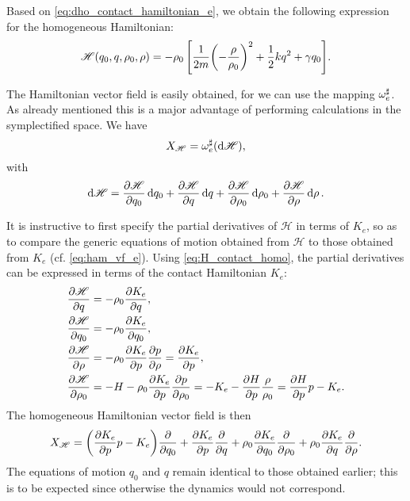 Based on \cref{eq:dho_contact_hamiltonian_e}, we obtain the following expression for the homogeneous Hamiltonian:
\begin{equation}
    \mathscr{H}(q_0, q, \rho_0, \rho) = -\rho_0\,\qty[\frac{1}{2m}\qty(-\frac{\rho}{\rho_0})^2 + \frac{1}{2}kq^2 + \gamma q_0]. 
    \label{eq:H_dho_homo}
\end{equation}

The Hamiltonian vector field is easily obtained, for we can use the mapping $\omega_e^\sharp$. As already mentioned this is a major advantage of performing calculations in the symplectified space. We have
$$ X_\mathscr{H} = \omega_e^\sharp(\dd{\mathscr{H}}),$$ 
with
$$ \dd{\mathscr{H}} = \pdv{\mathscr{H}}{q_0}\dd{q_0} 
                      + \pdv{\mathscr{H}}{q}\dd{q}
                      + \pdv{\mathscr{H}}{\rho_0}\dd{\rho_0}
                      + \pdv{\mathscr{H}}{\rho}\dd{\rho}.
$$

It is instructive to first specify the partial derivatives of $\mathscr{H}$ in terms of $K_e$, so as to compare the generic equations of motion obtained from $\mathscr{H}$ to those obtained from $K_e$ (cf. \cref{eq:ham_vf_e}). Using \cref{eq:H_contact_homo}, the partial derivatives can be expressed in terms of the contact Hamiltonian $K_e$:
\begin{equation}
    \begin{split}
        \pdv{\mathscr{H}}{q} &= -\rho_0 \pdv{K_e}{q}, \\
        \pdv{\mathscr{H}}{q_0} &= -\rho_0 \pdv{K_e}{q_0}, \\
        \pdv{\mathscr{H}}{\rho} &= -\rho_0 \pdv{K_e}{p}\pdv{p}{\rho} = \pdv{K_e}{p}, \\
        \pdv{\mathscr{H}}{\rho_0} &= -H - \rho_0 \pdv{K_e}{p}\pdv{p}{\rho_0} = -K_e - \pdv{H}{p}\frac{\rho}{\rho_0} = \pdv{H}{p}p - K_e.\\
    \end{split}
\end{equation}
The homogeneous Hamiltonian vector field is then
\begin{equation}
    X_\mathscr{H} = \qty(\pdv{K_e}{p}p - K_e)\pdv{}{q_0}
                    + \pdv{K_e}{p}\pdv{}{q}
                    + \rho_0\pdv{K_e}{q_0}\pdv{}{\rho_0}
                    + \rho_0\pdv{K_e}{q}\pdv{}{\rho}.
    \label{eq:hom_ham_vf}
\end{equation}
The equations of motion $q_0$ and $q$ remain identical to those obtained earlier; this is to be expected since otherwise the dynamics would not correspond. 


